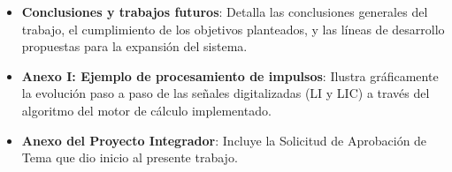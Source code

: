 \begin{itemize}
    \item \textbf{Conclusiones y trabajos futuros}: Detalla las conclusiones generales del trabajo, el cumplimiento de los objetivos planteados, y las líneas de desarrollo propuestas para la expansión del sistema.
    \item \textbf{Anexo I: Ejemplo de procesamiento de impulsos}: Ilustra gráficamente la evolución paso a paso de las señales digitalizadas (LI y LIC) a través del algoritmo del motor de cálculo implementado.
    \item \textbf{Anexo del Proyecto Integrador}: Incluye la Solicitud de Aprobación de Tema que dio inicio al presente trabajo.
\end{itemize}